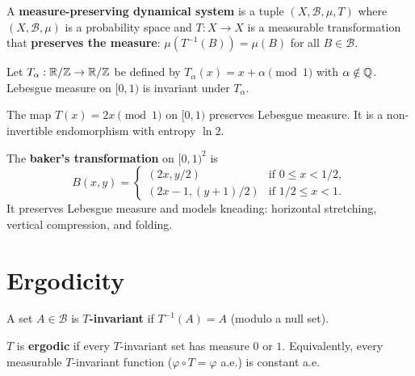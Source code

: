 \begin{definition}
A \textbf{measure-preserving dynamical system} is a tuple
$(X, \mathcal{B}, \mu, T)$ where $(X, \mathcal{B}, \mu)$ is a probability
space and $T : X \to X$ is a measurable transformation that
\textbf{preserves the measure}: $\mu(T^{-1}(B)) = \mu(B)$ for all
$B \in \mathcal{B}$.
\end{definition}

\begin{example}
Let $T_\alpha : \mathbb{R}/\mathbb{Z} \to \mathbb{R}/\mathbb{Z}$ be defined by
$T_\alpha(x) = x + \alpha \pmod{1}$ with $\alpha \notin \mathbb{Q}$. Lebesgue
measure on $[0,1)$ is invariant under $T_\alpha$.
\end{example}

\begin{example}
The map $T(x) = 2x \pmod{1}$ on $[0,1)$ preserves Lebesgue measure. It is
a non-invertible endomorphism with entropy $\ln 2$.
\end{example}

\begin{example}
The \textbf{baker's transformation} on $[0,1)^2$ is
\[
    B(x, y) = \begin{cases}
    (2x, y/2) & \text{if } 0 \leq x < 1/2, \\
    (2x - 1, (y+1)/2) & \text{if } 1/2 \leq x < 1.
    \end{cases}
\]
It preserves Lebesgue measure and models kneading: horizontal stretching,
vertical compression, and folding.
\end{example}

\section{Ergodicity}

\begin{definition}
A set $A \in \mathcal{B}$ is \textbf{$T$-invariant} if $T^{-1}(A) = A$
(modulo a null set).
\end{definition}

\begin{definition}
$T$ is \textbf{ergodic} if every $T$-invariant set has measure $0$ or $1$.
Equivalently, every measurable $T$-invariant function
($\varphi \circ T = \varphi$ a.e.) is constant a.e.
\end{definition}

